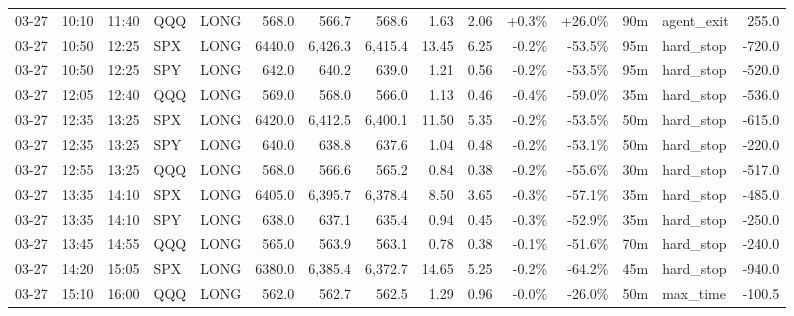 \documentclass[11pt,a4paper,twoside]{article}
\begin{document}
\begin{landscape}
\begin{center}
\begin{longtable}{>{\color{txtmain}}l l l l l r r r r r r r r >{\color{txtmain}}l r}
03-27 & 10:10 & 11:40 & QQQ & LONG & 568.0 & 566.7 & 568.6 & 1.63 & 2.06 & \textcolor{wingreen}{+0.3\%} & \textcolor{wingreen}{+26.0\%} & 90m & agent\_exit & \textcolor{wingreen}{255.0} \\
03-27 & 10:50 & 12:25 & SPX & LONG & 6440.0 & 6,426.3 & 6,415.4 & 13.45 & 6.25 & \textcolor{lossred}{-0.2\%} & \textcolor{lossred}{-53.5\%} & 95m & hard\_stop & \textcolor{lossred}{-720.0} \\
03-27 & 10:50 & 12:25 & SPY & LONG & 642.0 & 640.2 & 639.0 & 1.21 & 0.56 & \textcolor{lossred}{-0.2\%} & \textcolor{lossred}{-53.5\%} & 95m & hard\_stop & \textcolor{lossred}{-520.0} \\
03-27 & 12:05 & 12:40 & QQQ & LONG & 569.0 & 568.0 & 566.0 & 1.13 & 0.46 & \textcolor{lossred}{-0.4\%} & \textcolor{lossred}{-59.0\%} & 35m & hard\_stop & \textcolor{lossred}{-536.0} \\
03-27 & 12:35 & 13:25 & SPX & LONG & 6420.0 & 6,412.5 & 6,400.1 & 11.50 & 5.35 & \textcolor{lossred}{-0.2\%} & \textcolor{lossred}{-53.5\%} & 50m & hard\_stop & \textcolor{lossred}{-615.0} \\
03-27 & 12:35 & 13:25 & SPY & LONG & 640.0 & 638.8 & 637.6 & 1.04 & 0.48 & \textcolor{lossred}{-0.2\%} & \textcolor{lossred}{-53.1\%} & 50m & hard\_stop & \textcolor{lossred}{-220.0} \\
03-27 & 12:55 & 13:25 & QQQ & LONG & 568.0 & 566.6 & 565.2 & 0.84 & 0.38 & \textcolor{lossred}{-0.2\%} & \textcolor{lossred}{-55.6\%} & 30m & hard\_stop & \textcolor{lossred}{-517.0} \\
03-27 & 13:35 & 14:10 & SPX & LONG & 6405.0 & 6,395.7 & 6,378.4 & 8.50 & 3.65 & \textcolor{lossred}{-0.3\%} & \textcolor{lossred}{-57.1\%} & 35m & hard\_stop & \textcolor{lossred}{-485.0} \\
03-27 & 13:35 & 14:10 & SPY & LONG & 638.0 & 637.1 & 635.4 & 0.94 & 0.45 & \textcolor{lossred}{-0.3\%} & \textcolor{lossred}{-52.9\%} & 35m & hard\_stop & \textcolor{lossred}{-250.0} \\
03-27 & 13:45 & 14:55 & QQQ & LONG & 565.0 & 563.9 & 563.1 & 0.78 & 0.38 & \textcolor{lossred}{-0.1\%} & \textcolor{lossred}{-51.6\%} & 70m & hard\_stop & \textcolor{lossred}{-240.0} \\
03-27 & 14:20 & 15:05 & SPX & LONG & 6380.0 & 6,385.4 & 6,372.7 & 14.65 & 5.25 & \textcolor{lossred}{-0.2\%} & \textcolor{lossred}{-64.2\%} & 45m & hard\_stop & \textcolor{lossred}{-940.0} \\
03-27 & 15:10 & 16:00 & QQQ & LONG & 562.0 & 562.7 & 562.5 & 1.29 & 0.96 & \textcolor{lossred}{-0.0\%} & \textcolor{lossred}{-26.0\%} & 50m & max\_time & \textcolor{lossred}{-100.5} \\

\end{longtable}
\end{center}
\end{landscape}
\end{document}
